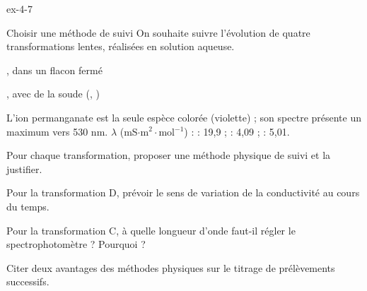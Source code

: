 \begin{blocLivre}{ex-4-7}
\begin{exercice}[2]{Choisir une méthode de suivi}
On souhaite suivre l'évolution de quatre transformations lentes, réalisées en solution aqueuse.
\begin{questions}[label=\otLabel{\Alph*.},leftmargin=1.9em]
\item {}
\item {}, dans un flacon fermé
\item {}
\item {}, avec de la soude (, )
\end{questions}
\begin{donnees}
L'ion permanganate est la seule espèce colorée (violette) ; son spectre présente un maximum vers 530 nm.
$\lambda$ (mS$\cdot$m$^2\cdot$mol$^{-1}$) :  : 19,9 ;  : 4,09 ;  : 5,01.
\end{donnees}
\begin{questions}
\item Pour chaque transformation, proposer une méthode physique de suivi et la justifier.
\item Pour la transformation D, prévoir le sens de variation de la conductivité au cours du temps.
\item Pour la transformation C, à quelle longueur d'onde faut-il régler le spectrophotomètre ? Pourquoi ?
\item Citer deux avantages des méthodes physiques sur le titrage de prélèvements successifs.
\end{questions}
\end{exercice}
\end{blocLivre}
